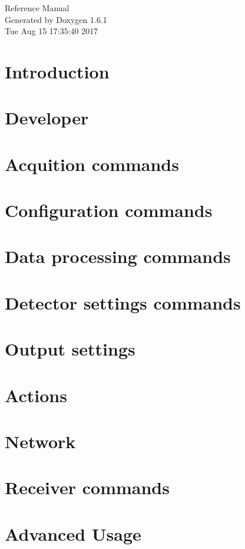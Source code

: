 \documentclass[a4paper]{article}
\begin{document}
\hypersetup{pageanchor=false}
\begin{titlepage}
\vspace*{7cm}
\begin{center}
{\Large Reference Manual}\\
\vspace*{1cm}
{\large Generated by Doxygen 1.6.1}\\
\vspace*{0.5cm}
{\small Tue Aug 15 17:35:40 2017}\\
\end{center}
\end{titlepage}
\tableofcontents
{}
\hypersetup{pageanchor=true}
\section{Introduction}
\label{index}\hypertarget{index}{}
\section{Developer}
\label{test}
\hypertarget{test}{}

\section{Acquition commands}
\label{acquisition}
\hypertarget{acquisition}{}

\section{Configuration commands}
\label{config}
\hypertarget{config}{}

\section{Data processing commands}
\label{data}
\hypertarget{data}{}

\section{Detector settings commands}
\label{settings}
\hypertarget{settings}{}

\section{Output settings}
\label{output}
\hypertarget{output}{}

\section{Actions}
\label{actions}
\hypertarget{actions}{}

\section{Network}
\label{network}
\hypertarget{network}{}

\section{Receiver commands}
\label{receiver}
\hypertarget{receiver}{}

\section{Advanced Usage}
\label{advanced}
\hypertarget{advanced}{}

\printindex
\end{document}
